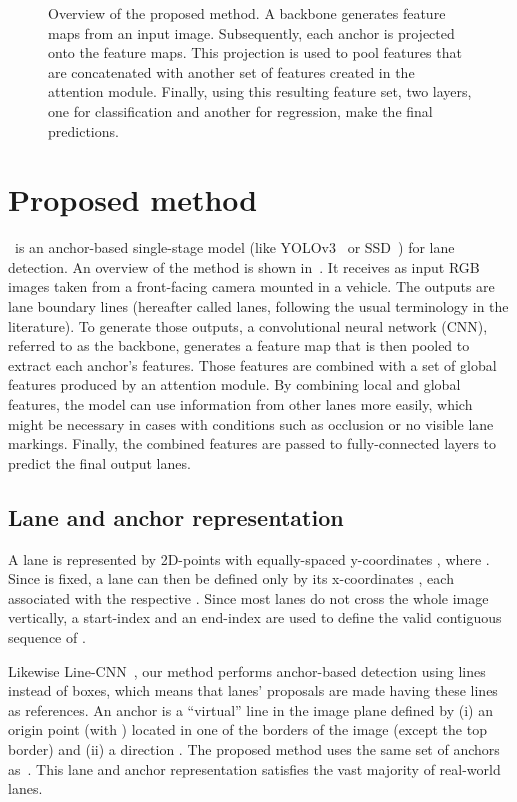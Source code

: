 \documentclass[final]{cvpr}
\begin{document}
\begin{figure*}[t]
{\begin{tikzpicture}[every node/.style={inner sep=0,outer sep=0},x={(1,0)},y={(0,1)},z={({cos(45)},{sin(45)})}]
	
\end{tikzpicture} }
	\caption{Overview of the proposed method. A backbone generates feature maps from an input image. Subsequently, each anchor is projected onto the feature maps. This projection is used to pool features that are concatenated with another set of features created in the attention module. Finally, using this resulting feature set, two layers, one for classification and another for regression, make the final predictions.}
	\label{fig:overview}
\end{figure*}
 \section{Proposed method}


\methodname~is an anchor-based single-stage model (like YOLOv3~\cite{yolo} or SSD~\cite{ssd}) for lane detection. An overview of the method is shown in~. It receives as input RGB images  taken from a front-facing camera mounted in a vehicle. The outputs are lane boundary lines (hereafter called lanes, following the usual terminology in the literature). To generate those outputs, a convolutional neural network (CNN), referred to as the backbone, generates a feature map that is then pooled to extract each anchor's features. Those features are combined with a set of global features produced by an attention module. By combining local and global features, the model can use information from other lanes more easily, which might be necessary in cases with conditions such as occlusion or no visible lane markings. Finally, the combined features are passed to fully-connected layers to predict the final output lanes.

\subsection{Lane and anchor representation}
\label{sec:rep}


A lane is represented by 2D-points with equally-spaced y-coordinates , where . Since  is fixed, a lane can then be defined only by its x-coordinates , each  associated with the respective . Since most lanes do not cross the whole image vertically, a start-index  and an end-index  are used to define the valid contiguous sequence of .

Likewise Line-CNN~\cite{linecnn}, our method performs anchor-based detection using lines instead of boxes, which means that lanes' proposals are made having these lines as references. An anchor is a ``virtual'' line in the image plane defined by (i) an origin point  (with ) located in one of the borders of the image (except the top border) and (ii) a direction . The proposed method uses the same set of anchors as~\cite{linecnn}. This lane and anchor representation satisfies the vast majority of real-world lanes.
\end{document}
